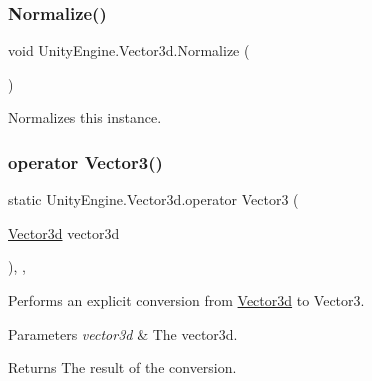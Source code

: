 \subsubsection{\texorpdfstring{Normalize()}{Normalize()}\hspace{0.1cm}{\footnotesize\ttfamily [2/2]}}
{\footnotesize\ttfamily void Unity\+Engine.\+Vector3d.\+Normalize (\begin{DoxyParamCaption}{ }\end{DoxyParamCaption})\hspace{0.3cm}{\ttfamily [inline]}}



Normalizes this instance. 

\mbox{\label{struct_unity_engine_1_1_vector3d_add8275b06ebc0a571b143b8b96b3f1f6}} 
\subsubsection{\texorpdfstring{operator Vector3()}{operator Vector3()}}
{\footnotesize\ttfamily static Unity\+Engine.\+Vector3d.\+operator Vector3 (\begin{DoxyParamCaption}\item[{\hyperlink{struct_unity_engine_1_1_vector3d}{Vector3d}}]{vector3d }\end{DoxyParamCaption})\hspace{0.3cm}{\ttfamily [inline]}, {\ttfamily [explicit]}, {\ttfamily [static]}}



Performs an explicit conversion from \hyperlink{struct_unity_engine_1_1_vector3d}{Vector3d} to Vector3. 


\begin{DoxyParams}{Parameters}
{\em vector3d} & The vector3d.\\
\hline
\end{DoxyParams}
\begin{DoxyReturn}{Returns}
The result of the conversion.
\end{DoxyReturn}
\mbox{\label{struct_unity_engine_1_1_vector3d_a6666f7c28524384b2929a7e41d71978a}} 
